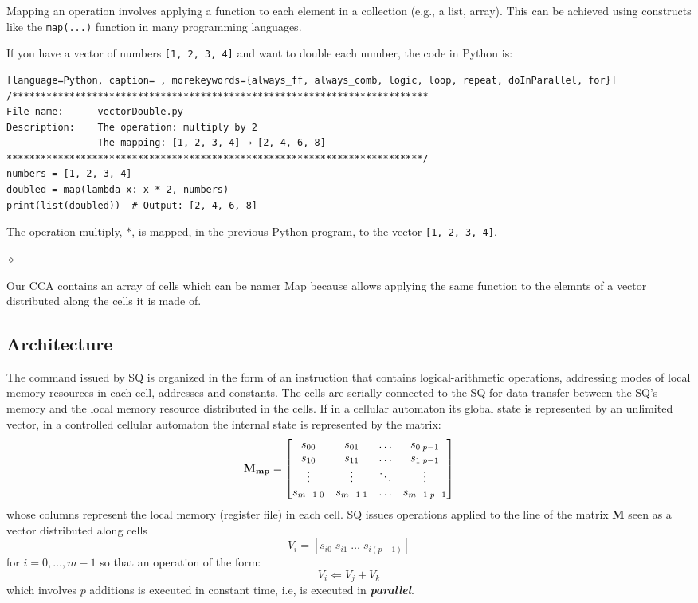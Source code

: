 Mapping an operation involves applying a function to each element in a collection (e.g., a list, array). This can be achieved using constructs like the {\tt map(...)} function in many programming languages.
\begin{exemplu}
If you have a vector of numbers {\tt [1, 2, 3, 4]} and want to double each number, the code in Python is:
{\small
{\em
\begin{shaded*}
\begin{lstlisting}[language=Python, caption= , morekeywords={always_ff, always_comb, logic, loop, repeat, doInParallel, for}]
/*************************************************************************
File name:      vectorDouble.py
Description:    The operation: multiply by 2
                The mapping: [1, 2, 3, 4] → [2, 4, 6, 8]    
*************************************************************************/
numbers = [1, 2, 3, 4]
doubled = map(lambda x: x * 2, numbers)
print(list(doubled))  # Output: [2, 4, 6, 8]
\end{lstlisting}
\end{shaded*}
}
}
The operation multiply, $*$, is mapped, in the previous Python program, to the vector {\tt [1, 2, 3, 4]}.

$\diamond$
\end{exemplu}
Our CCA contains an array of cells which can be namer Map because allows applying the same  function to the elemnts of a vector distributed along the cells  it is made of.

\subsection{Architecture}

The command issued by SQ is organized in the form of an instruction that contains logical-arithmetic operations, addressing modes of local memory resources in each cell, addresses and constants. The cells are serially connected to the SQ for data transfer between the SQ's memory and the local memory resource distributed in the cells. If in a cellular automaton its global state is represented by an unlimited  vector, in a controlled cellular automaton the internal state is represented by the matrix:
\[
{\bf M_{mp}} = \begin{bmatrix}
    s_{00} & s_{01} & \dots  & s_{0 \; p-1}\\
    s_{10} & s_{11} & \dots  & s_{1 \; p-1}\\
    \vdots & \vdots & \ddots & \vdots\\
    s_{m-1 \; 0} & s_{m-1 \; 1} & \dots  & s_{m-1 \; p-1}
    \end{bmatrix}
\]
whose columns represent the local memory (register file) in each cell. SQ issues operations applied to the line of the matrix {\bf M} seen as a vector distributed along cells
$$V_i = [s_{i0} \; s_{i1} \; \ldots \; s_{i(p-1)}]$$ for $i = 0, \ldots, m-1$ so that an operation of the form:
$$V_i \Leftarrow V_j + V_k$$
which involves $p$ additions is executed in constant time, i.e, is executed in {\bf {\em parallel}}.

